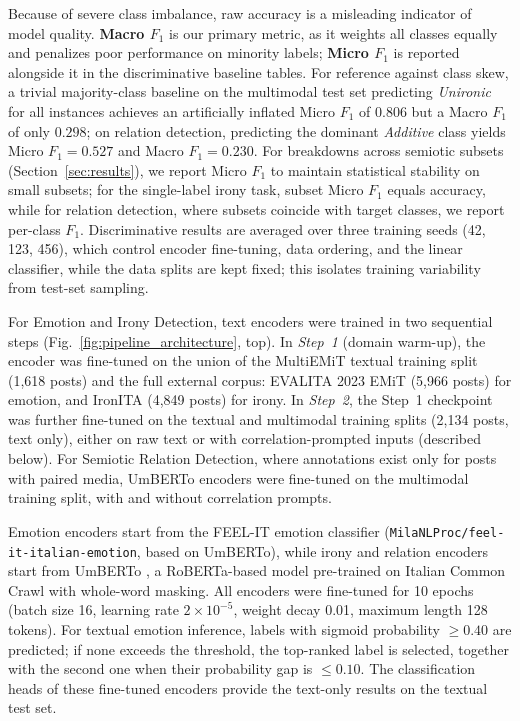 Because of severe class imbalance, raw accuracy is a misleading indicator of model quality. \textbf{Macro $F_1$} is our primary metric, as it weights all classes equally and penalizes poor performance on minority labels; \textbf{Micro $F_1$} is reported alongside it in the discriminative baseline tables. For reference against class skew, a trivial majority-class baseline on the multimodal test set predicting \textit{Unironic} for all instances achieves an artificially inflated Micro $F_1$ of $0.806$ but a Macro $F_1$ of only $0.298$; on relation detection, predicting the dominant \textit{Additive} class yields Micro $F_1 = 0.527$ and Macro $F_1 = 0.230$. For breakdowns across semiotic subsets (Section~\ref{sec:results}), we report Micro $F_1$ to maintain statistical stability on small subsets; for the single-label irony task, subset Micro $F_1$ equals accuracy, while for relation detection, where subsets coincide with target classes, we report per-class $F_1$. Discriminative results are averaged over three training seeds (42, 123, 456), which control encoder fine-tuning, data ordering, and the linear classifier, while the data splits are kept fixed; this isolates training variability from test-set sampling.

For Emotion and Irony Detection, text encoders were trained in two sequential steps (Fig.~\ref{fig:pipeline_architecture}, top). In \textit{Step~1} (domain warm-up), the encoder was fine-tuned on the union of the MultiEMiT textual training split (1,618 posts) and the full external corpus: EVALITA 2023 EMiT \cite{emit} (5,966 posts) for emotion, and IronITA \cite{ironita2018} (4,849 posts) for irony. In \textit{Step~2}, the Step~1 checkpoint was further fine-tuned on the textual and multimodal training splits (2,134 posts, text only), either on raw text or with correlation-prompted inputs (described below). For Semiotic Relation Detection, where annotations exist only for posts with paired media, UmBERTo encoders were fine-tuned on the multimodal training split, with and without correlation prompts.

Emotion encoders start from the FEEL-IT emotion classifier \cite{bianchi2021feel} (\texttt{MilaNLProc/feel-it-italian-emotion}, based on UmBERTo), while irony and relation encoders start from UmBERTo \cite{musixmatch-2020-umberto}, a RoBERTa-based model \cite{liu2019roberta} pre-trained on Italian Common Crawl with whole-word masking. All encoders were fine-tuned for 10 epochs (batch size 16, learning rate $2\times10^{-5}$, weight decay 0.01, maximum length 128 tokens). For textual emotion inference, labels with sigmoid probability $\geq 0.40$ are predicted; if none exceeds the threshold, the top-ranked label is selected, together with the second one when their probability gap is $\leq 0.10$. The classification heads of these fine-tuned encoders provide the text-only results on the textual test set.

